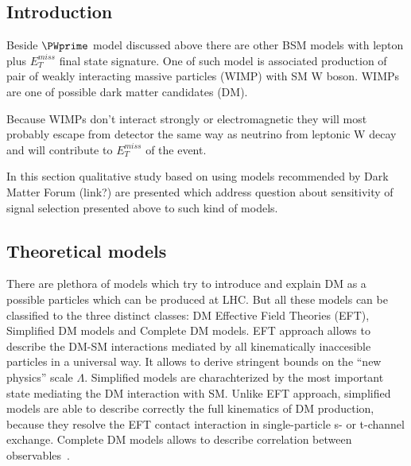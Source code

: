 \subsection{Introduction}

Beside $\PWprime$ model discussed above there are other BSM models 
with lepton plus $E_{T}^{miss}$ final state signature.
One of such model is associated 
production of pair of weakly interacting massive particles (WIMP)
with SM W boson. WIMPs are one of possible dark matter candidates (DM).

Because WIMPs don't interact strongly or electromagnetic they will most probably escape from detector the same way as neutrino
from leptonic W decay and will contribute to $E_{T}^{miss}$ of the event.

In this section qualitative study based on using models recommended by Dark Matter Forum (link?) are presented 
which address question about sensitivity of signal selection presented above to such kind of models.



\subsection{Theoretical models}

There are plethora of models which try to introduce and explain DM as a possible particles which can be produced at LHC. 
But all these models can be classified to the three distinct classes: DM Effective Field Theories (EFT), Simplified DM models 
and Complete DM models. EFT approach allows to describe the DM-SM interactions mediated by all 
kinematically inaccesible particles in a universal way. 
It allows to derive stringent bounds on the ``new physics'' scale $\Lambda$. 
Simplified models are charachterized by the most important state mediating the DM interaction with SM. Unlike EFT approach,
simplified models are able to describe correctly the full kinematics of DM production, because they resolve the EFT contact interaction in single-particle 
s- or t-channel exchange. Complete DM models allows to describe correlation between observables~\cite{arXiv:1506.03116}.

